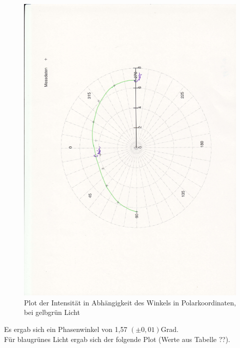 \documentclass[12pt]{scrartcl}
\begin{document}
\begin{figure}[H]
\centering
    \includegraphics[scale = 0.3, angle = -90]{a_5_gg.pdf}
  	\caption[Plot der Intensität in Abhängigkeit des Winkels in Polarkoordinaten, bei gelbgrün Licht]{Plot der Intensität in Abhängigkeit des Winkels in Polarkoordinaten, bei gelbgrün Licht}
  \label{fig:a_5_gg}
\end{figure}

Es ergab sich ein Phasenwinkel von 1,57 $(\pm 0,01)$Grad.\\

Für blaugrünes Licht ergab sich der folgende Plot (Werte aus Tabelle ??).
\end{document}
